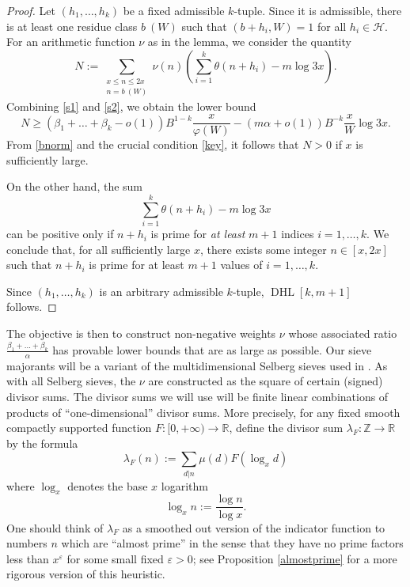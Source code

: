 \documentclass{bmcart}
\DeclareMathOperator*\DHL{DHL}
\theoremstyle{plain}
\theoremstyle{definition}
\newcommand\R{\mathbb{R}}
\newcommand\Z{\mathbb{Z}}
\newcommand\eps{\varepsilon}
\renewcommand{\phi}{\varphi}
\begin{document}
\begin{proof}
Let $(h_1,\ldots,h_{k})$ be a fixed
  admissible $k$-tuple.  Since it is admissible, there is at least
  one residue class $b\ (W)$ such that $(b+h_i,W)=1$ for all $h_i
  \in {\mathcal H}$.  For an arithmetic function $\nu$ as in the
  lemma, we consider the quantity
$$
N:=\sum_{\substack{x \leq n \leq 2x\\ n = b\ (W)}}
 \nu(n) \left(\sum_{i=1}^{k} \theta(n+h_i) - m\log 3x\right).
$$
Combining \eqref{s1} and \eqref{s2}, we obtain the lower bound
$$
N\geq (\beta_1+\dots+\beta_k-o(1)) B^{1-k} \frac{x}{\phi(W)} - (m\alpha+o(1)) B^{-k} \frac{x}{W} \log 3x.
$$
From \eqref{bnorm} and the crucial condition \eqref{key}, it follows that
$N>0$ if $x$ is sufficiently large.
\par
On the other hand, the sum
$$
\sum_{i=1}^{k} \theta(n+h_i) - m\log 3x
$$
can  be positive only if $n+h_i$ is prime for \emph{at least} $m+1$
indices $i=1, \ldots, k$.  We conclude that, for all sufficiently
large $x$, there exists some integer $n \in [x,2x]$ such that $n+h_i$
is prime for at least $m+1$ values of $i=1,\ldots,k$.
\par
Since $(h_1,\dots,h_k)$ is an arbitrary admissible $k$-tuple,
$\DHL[k,m+1]$ follows.
\end{proof}

The objective is then to construct non-negative weights $\nu$ whose associated ratio $\frac{\beta_1+\dots+\beta_k}{\alpha}$ has provable lower bounds that are as large as possible.   Our sieve majorants will be a variant of the multidimensional Selberg sieves used in \cite{maynard-new}.  As with all Selberg sieves, the $\nu$ are constructed as the square of certain (signed) divisor sums.  The divisor sums we will use will be finite linear combinations of products of ``one-dimensional'' divisor sums.  More precisely, for any fixed smooth compactly supported function $F: [0,+\infty) \to \R$, define the divisor sum $\lambda_F: \Z \to \R$ by the formula
\begin{equation}\label{lambdaf-def}
\lambda_F(n) := \sum_{d|n} \mu(d) F( \log_x d )
\end{equation}
where $\log_x$ denotes the base $x$ logarithm
\begin{equation}\label{logx-def}
\log_x n:= \frac{\log n}{\log x}.
\end{equation}
One should think of $\lambda_F$ as a smoothed out version of the indicator function to numbers $n$ which are ``almost prime'' in the sense that they have no prime factors less than $x^\eps$ for some small fixed $\eps>0$; see Proposition \ref{almostprime} for a more rigorous version of this heuristic.
\end{document}
